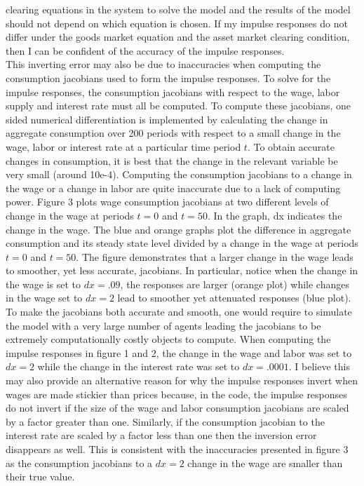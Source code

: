 \documentclass[titlepage]{\econtex}\providecommand{\texname}{FBS-NK}
\begin{document}
clearing equations in the system to solve the model and the results of the model should not depend on which equation is chosen. If my impulse responses do not differ under the goods market equation and the asset market clearing condition, then I can be confident of the accuracy of the impulse responses. \\

This inverting error may also be due to inaccuracies when computing the consumption jacobians used to form the impulse responses. To solve for the impulse responses, the consumption jacobians with respect to the wage, labor supply and interest rate must all be computed. To compute these jacobians, one sided numerical differentiation is implemented by calculating the change in aggregate consumption over 200 periods with respect to a small change in the wage, labor or interest rate at a particular time period $t$. To obtain accurate changes in consumption, it is best that the change in the relevant variable be very small (around 10e-4). Computing the consumption jacobians to a change in the wage or a change in labor are quite inaccurate due to a lack of computing power.  Figure 3 plots wage consumption jacobians at two different levels of change in the wage at periods $t=0$ and $t=50$. In the graph, dx indicates the change in the wage. The blue and orange graphs plot the difference in aggregate consumption and its steady state level divided by a change in the wage at periods $t = 0$ and $t =50$.  The figure demonstrates that a larger change in the wage leads to smoother, yet less accurate, jacobians. In particular, notice when the change in the wage is set to $dx=.09$, the responses are larger (orange plot) while changes in the wage set to $dx=2$ lead to smoother yet attenuated responses (blue plot).   To make the jacobians both accurate and smooth, one would require to simulate the model with a very large number of agents leading the jacobians to be extremely computationally costly objects to compute.  When computing the impulse responses in figure 1 and 2, the change in the wage and labor was set to $dx=2$ while the change in the interest rate was set to $dx=.0001$. I believe this may also provide an alternative reason for why the impulse responses invert when wages are made stickier than prices because, in the code, the impulse responses do not invert if the size of the wage and labor consumption jacobians are scaled by a factor greater than one. Similarly, if the consumption jacobian to the interest rate are scaled by a factor less than one then the inversion error disappears as well. This is consistent with the inaccuracies presented in figure 3 as the consumption jacobians to a $dx=2$ change in the wage are smaller than their true value. 
\end{document}
